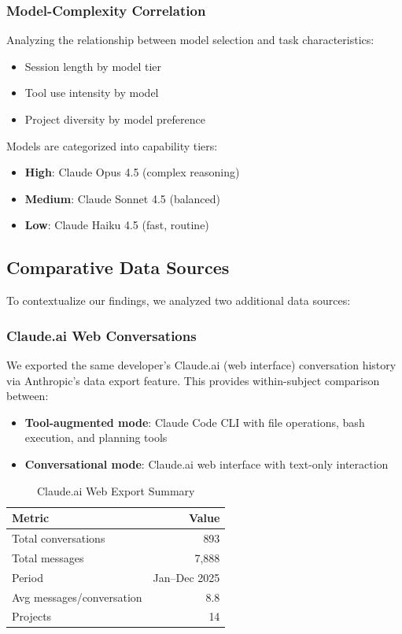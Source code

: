 \subsubsection{Model-Complexity Correlation}

Analyzing the relationship between model selection and task characteristics:
\begin{itemize}
    \item Session length by model tier
    \item Tool use intensity by model
    \item Project diversity by model preference
\end{itemize}

Models are categorized into capability tiers:
\begin{itemize}
    \item \textbf{High}: Claude Opus 4.5 (complex reasoning)
    \item \textbf{Medium}: Claude Sonnet 4.5 (balanced)
    \item \textbf{Low}: Claude Haiku 4.5 (fast, routine)
\end{itemize}

\subsection{Comparative Data Sources}

To contextualize our findings, we analyzed two additional data sources:

\subsubsection{Claude.ai Web Conversations}

We exported the same developer's Claude.ai (web interface) conversation history via Anthropic's data export feature. This provides within-subject comparison between:
\begin{itemize}
    \item \textbf{Tool-augmented mode}: Claude Code CLI with file operations, bash execution, and planning tools
    \item \textbf{Conversational mode}: Claude.ai web interface with text-only interaction
\end{itemize}

\begin{table}[h]
\caption{Claude.ai Web Export Summary}
\label{tab:web}
\begin{tabular}{lr}
\toprule
\textbf{Metric} & \textbf{Value} \\
\midrule
Total conversations & 893 \\
Total messages & 7,888 \\
Period & Jan--Dec 2025 \\
Avg messages/conversation & 8.8 \\
Projects & 14 \\
\bottomrule
\end{tabular}
\end{table}


